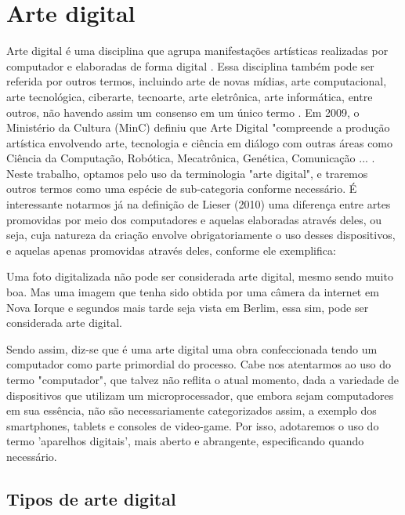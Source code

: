 \section{Arte digital}
\label{sec:arte digital}
Arte digital é uma disciplina que agrupa manifestações artísticas realizadas por computador e elaboradas de forma digital \cite{Lieser}. Essa disciplina também pode ser referida por outros termos, incluindo arte de novas mídias, arte computacional, arte tecnológica, ciberarte, tecnoarte, arte eletrônica, arte informática, entre outros, não havendo assim um consenso em um único termo \cite{Gobira, Arantes}.  Em 2009, o Ministério da Cultura (MinC) definiu que Arte Digital "compreende a produção artística envolvendo arte, tecnologia e ciência em diálogo com outras áreas como Ciência da Computação, Robótica, Mecatrônica, Genética, Comunicação ... \cite{MINC}. Neste trabalho, optamos pelo uso da terminologia "arte digital", e traremos outros termos como uma espécie de sub-categoria conforme necessário. É interessante notarmos já na definição de Lieser (2010) uma diferença entre artes promovidas por meio dos computadores e aquelas elaboradas através deles, ou seja, cuja natureza da criação envolve obrigatoriamente o uso desses dispositivos, e aquelas apenas promovidas através deles, conforme ele exemplifica:

\begin{citacao}
Uma foto digitalizada não pode ser considerada arte digital, mesmo sendo muito boa. Mas uma imagem que tenha sido obtida por uma câmera da internet em Nova Iorque e segundos mais tarde seja vista em Berlim, essa sim, pode ser considerada arte digital. \cite{Lieser}	
\end{citacao}


Sendo assim, diz-se que é uma arte digital uma obra confeccionada tendo um computador como parte primordial do processo. Cabe nos atentarmos ao uso do termo "computador", que talvez não reflita o atual momento, dada a variedade de dispositivos que utilizam um microprocessador, que embora sejam computadores em sua essência, não são necessariamente categorizados assim, a exemplo dos smartphones, tablets e consoles de video-game. Por isso, adotaremos o uso do termo 'aparelhos digitais', mais aberto e abrangente, especificando quando necessário.


\subsection{Tipos de arte digital}
\label{subsec: formas de arte digital}

